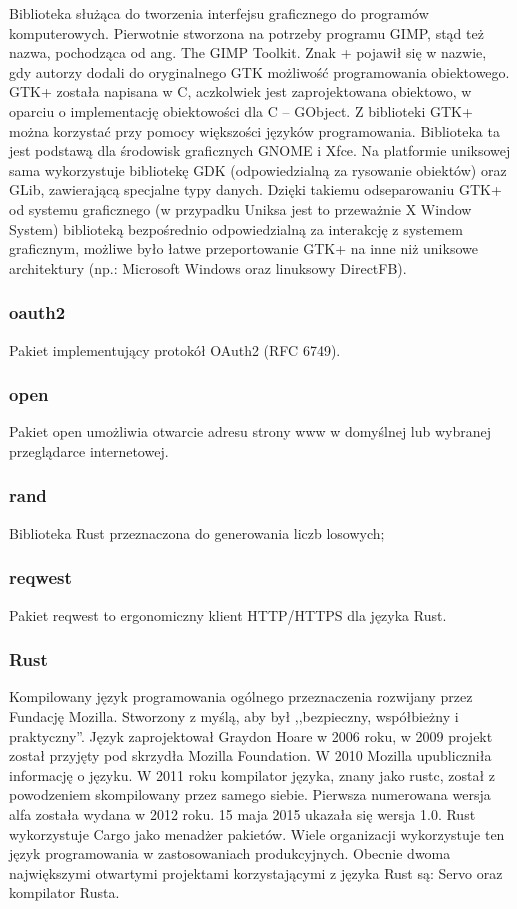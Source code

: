 \documentclass[12pt,a4paper]{article}
\begin{document}
					\indent  Biblioteka służąca do tworzenia interfejsu graficznego do programów komputerowych. Pierwotnie stworzona na potrzeby programu GIMP,
					stąd też nazwa, pochodząca od ang. The GIMP Toolkit. Znak + pojawił się w nazwie, gdy autorzy dodali do oryginalnego GTK możliwość programowania obiektowego.
					GTK+ została napisana w C, aczkolwiek jest zaprojektowana obiektowo, w oparciu o implementację obiektowości dla C – GObject. Z biblioteki GTK+ można korzystać
					przy pomocy większości języków programowania. Biblioteka ta jest podstawą dla środowisk graficznych GNOME i Xfce. Na platformie uniksowej sama wykorzystuje
					bibliotekę GDK (odpowiedzialną za rysowanie obiektów) oraz GLib, zawierającą specjalne typy danych. Dzięki takiemu odseparowaniu GTK+ od systemu graficznego
					(w przypadku Uniksa jest to przeważnie X Window System) biblioteką bezpośrednio odpowiedzialną za interakcję z systemem graficznym, możliwe było łatwe
					przeportowanie GTK+ na inne niż uniksowe architektury (np.: Microsoft Windows oraz linuksowy DirectFB).
				\subsubsection{oauth2}

					\indent Pakiet implementujący protokół OAuth2 (RFC 6749).
				
				\subsubsection{open}
					
					\indent Pakiet open umożliwia otwarcie adresu strony www w domyślnej lub wybranej przeglądarce internetowej.
				\subsubsection{rand}

					\indent Biblioteka Rust przeznaczona do generowania liczb losowych;
				\subsubsection{reqwest}

					\indent Pakiet reqwest to ergonomiczny klient HTTP/HTTPS dla języka Rust.
				\subsubsection{Rust}

					\indent Kompilowany język programowania ogólnego przeznaczenia rozwijany przez Fundację Mozilla. Stworzony z myślą, aby był ,,bezpieczny, współbieżny i praktyczny''.
					Język zaprojektował Graydon Hoare w 2006 roku, w 2009 projekt został przyjęty pod skrzydła Mozilla Foundation. W 2010 Mozilla upubliczniła informację o języku.
					W 2011 roku kompilator języka, znany jako rustc, został z powodzeniem skompilowany przez samego siebie. Pierwsza numerowana wersja alfa została wydana w 2012 roku.
					15 maja 2015 ukazała się wersja 1.0. Rust wykorzystuje Cargo jako menadżer pakietów. Wiele organizacji wykorzystuje ten język programowania w zastosowaniach
					produkcyjnych. Obecnie dwoma największymi otwartymi projektami korzystającymi z języka Rust są: Servo oraz kompilator Rusta. 
\end{document}
